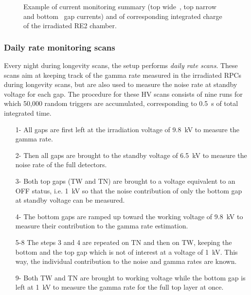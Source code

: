 \begin{figure}[H]
\begin{subfigure}{0.5\linewidth}
        	\caption{\label{fig:Longevity:D}}
    	\end{subfigure}
		\caption{\label{fig:Longevity} Example of current monitoring summary (top wide~, top narrow~ and bottom~ gap currents) and of corresponding integrated charge~ of the irradiated RE2 chamber.}
	\end{figure}
\vfill
	
\newpage
	
		\subsubsection{Daily rate monitoring scans}
		\label{chapt5:sssec:dailyratescan}
	
	Every night during longevity scans, the setup performs \textit{daily rate scans}. These scans aim at keeping track of the gamma rate measured in the irradiated RPCs during longevity scans, but are also used to measure the noise rate at standby voltage for each gap. The procedure for these HV scans consists of nine runs for which 50,000 random triggers are accumulated, corresponding to \SI{0.5}{s} of total integrated time.
	
	\begin{itemize}
		\item[1-] All gaps are first left at the irradiation voltage of \SI{9.8}{kV} to measure the gamma rate.
		\item[2-] Then all gaps are brought to the standby voltage of \SI{6.5}{kV} to measure the noise rate of the full detectors.
		\item[3-] Both top gaps (TW and TN) are brought to a voltage equivalent to an OFF status, i.e. \SI{1}{kV} so that the noise contribution of only the bottom gap at standby voltage can be measured.
		\item[4-] The bottom gaps are ramped up toward the working voltage of \SI{9.8}{kV} to measure their contribution to the gamma rate estimation.
		\item[5-8] The steps 3 and 4 are repeated on TN and then on TW, keeping the bottom and the top gap which is not of interest at a voltage of \SI{1}{kV}. This way, the individual contribution to the noise and gamma rates are known.
		\item[9-] Both TW and TN are brought to working voltage while the bottom gap is left at \SI{1}{kV} to measure the gamma rate for the full top layer at once.
	\end{itemize}
	

